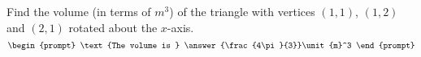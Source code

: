 \documentclass{ximera}
\author{Gregory Hartman \and Matthew Carr}
\begin{document}
\begin{exercise}






Find the volume (in terms of $\unit{m}^3$) of the triangle with vertices $(1,1)$, $(1,2)$ and $(2,1)$ rotated about the $x$-axis.
\[
\begin{prompt}
\text{The volume is } \answer{\frac{4\pi}{3}}\unit{m}^3
\end{prompt}
\]




\end{exercise}
\end{document}
